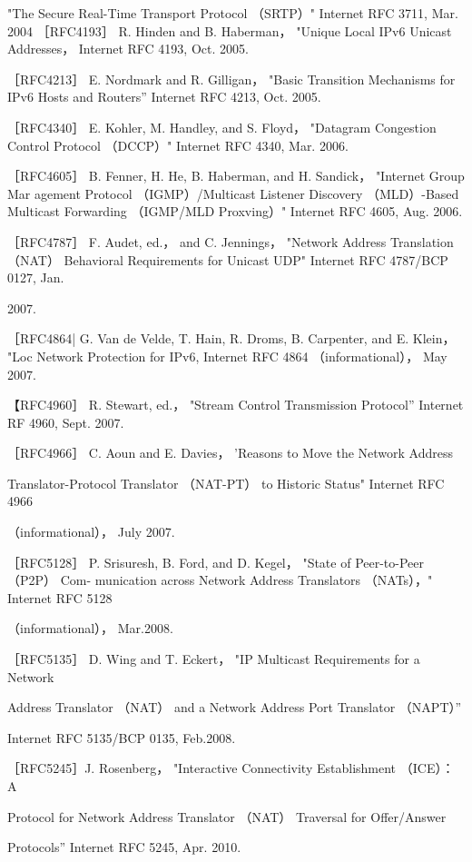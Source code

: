 "The Secure Real-Time Transport Protocol （SRTP）" Internet RFC 3711, Mar. 2004
［RFC4193］ R. Hinden and B. Haberman， "Unique Local IPv6 Unicast Addresses，
Internet RFC 4193, Oct. 2005.

［RFC4213］ E. Nordmark and R. Gilligan， "Basic Transition Mechanisms for IPv6
Hosts and Routers” Internet RFC 4213, Oct. 2005.

［RFC4340］ E. Kohler, M. Handley, and S. Floyd， "Datagram Congestion Control
Protocol （DCCP）" Internet RFC 4340, Mar. 2006.

［RFC4605］ B. Fenner, H. He, B. Haberman, and H. Sandick， "Internet Group Mar
agement Protocol （IGMP）/Multicast Listener Discovery （MLD）-Based Multicast
Forwarding （IGMP/MLD Proxving）" Internet RFC 4605, Aug. 2006.

［RFC4787］ F. Audet, ed.， and C. Jennings， "Network Address Translation （NAT）
Behavioral Requirements for Unicast UDP" Internet RFC 4787/BCP 0127, Jan.

2007.

［RFC4864| G. Van de Velde, T. Hain, R. Droms, B. Carpenter, and E. Klein， "Loc
Network Protection for IPv6, Internet RFC 4864 （informational）， May 2007.

【RFC4960］ R. Stewart, ed.， "Stream Control Transmission Protocol” Internet RF
4960, Sept. 2007.

［RFC4966］ C. Aoun and E. Davies， 'Reasons to Move the Network Address

Translator-Protocol Translator （NAT-PT） to Historic Status" Internet RFC 4966

（informational）， July 2007.

［RFC5128］ P. Srisuresh, B. Ford, and D. Kegel， "State of Peer-to-Peer （P2P） Com-
munication across Network Address Translators （NATs），" Internet RFC 5128

（informational）， Mar.2008.

［RFC5135］ D. Wing and T. Eckert， "IP Multicast Requirements for a Network

Address Translator （NAT） and a Network Address Port Translator （NAPT）”

Internet RFC 5135/BCP 0135, Feb.2008.

［RFC5245］J. Rosenberg， "Interactive Connectivity Establishment （ICE）： A

Protocol for Network Address Translator （NAT） Traversal for Offer/Answer

Protocols” Internet RFC 5245, Apr. 2010.

